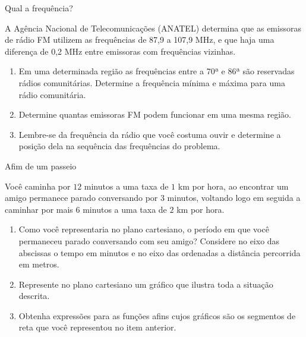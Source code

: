\begin{task}{Qual a frequência?}
\label{\detokenize{AF107-6:atividade-qual-a-frequencia}}\label{\detokenize{AF107-6:id4}}

A Agência Nacional de Telecomunicações (ANATEL) determina que as emissoras de rádio FM utilizem as frequências de 87,9 a 107,9 MHz, e que haja uma diferença de 0,2 MHz entre emissoras com frequências vizinhas.
\begin{enumerate}
\item {} 
Em uma determinada região as frequências entre a 70ª e 86ª são reservadas rádios comunitárias. Determine a frequência mínima e máxima para uma rádio comunitária.

\item {} 
Determine quantas emissoras FM podem funcionar em uma mesma região.

\item {} 
Lembre-se da frequência da rádio que você costuma ouvir e determine a posição dela na sequência das frequências do problema.

\end{enumerate}
\end{task}

\label{\detokenize{AF107-A::doc}}\label{\detokenize{AF107-A:para-saber-mais-funcao-afim-por-partes}}
\begin{task}{Afim de um passeio}

Você caminha por \(12\) minutos a uma taxa de \(1\) km por hora,  ao encontrar um amigo permanece parado conversando por \(3\) minutos, voltando logo em seguida  a caminhar por mais \(6\) minutos a uma taxa de \(2\) km por hora.
\begin{enumerate}
\item {} 
Como você representaria no plano cartesiano, o período em que você permaneceu parado conversando com seu amigo? Considere no eixo das abscissas o tempo em minutos e no eixo das ordenadas a distância percorrida em metros.

\item {} 
Represente no plano cartesiano um gráfico que ilustra toda a situação descrita.

\item {} 
Obtenha expressões para as funções afins cujos gráficos são os segmentos de reta que você representou no item anterior.

\end{enumerate}
\end{task}

